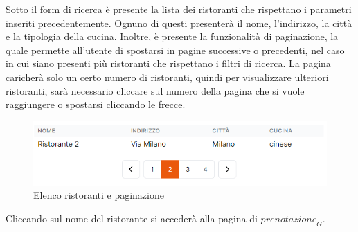 Sotto il form di ricerca è presente la lista dei ristoranti che rispettano i parametri inseriti precedentemente. Ognuno di questi presenterà il nome, l'indirizzo, la città e la tipologia della cucina. Inoltre, è presente la funzionalità di paginazione, la quale permette all'utente di spostarsi in pagine successive o precedenti, nel caso in cui siano presenti più ristoranti che rispettano i filtri di ricerca. La pagina caricherà solo un certo numero di ristoranti, quindi per visualizzare ulteriori ristoranti, sarà necessario cliccare sul numero della pagina che si vuole raggiungere o spostarsi cliccando le frecce.
\begin{figure}[H]
    \centering
    \includegraphics[width=0.6\linewidth]{img/lista_e_pagination.png}
    \caption{Elenco ristoranti e paginazione}
    \label{fig:lista_e_pagination}
\end{figure}
Cliccando sul nome del ristorante si accederà alla pagina di $\textit{prenotazione}_G$.

